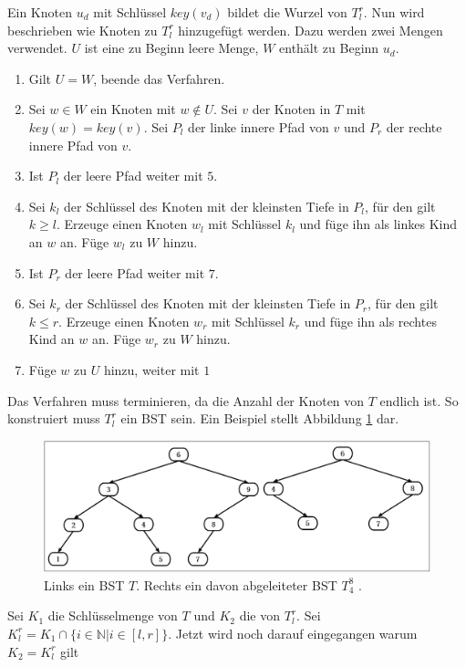 \documentclass[a4paper,12pt]{article}
\begin{document}
\noindent Ein Knoten $u_d$ mit Schlüssel $\mathit{key}(v_d)$ bildet die Wurzel von $T^r_l$. Nun wird beschrieben wie Knoten zu $T^r_l$ hinzugefügt werden.
Dazu werden zwei Mengen verwendet. $U$ ist eine zu Beginn leere Menge, $W$ enthält zu Beginn $u_d$.
\begin{enumerate}
	\item Gilt $U = W$, beende das Verfahren.
	\item Sei $w \in W$ ein Knoten mit $w \notin U$.  Sei $v$ der Knoten in $T$ mit $\mathit{key}(w ) = \mathit{key}(v)$. Sei $P_l$ der linke innere Pfad von $v$ und $P_r$ der rechte innere Pfad von $v$.
	\item Ist $P_l$ der leere Pfad weiter mit $5$.
	\item Sei $k_l$ der Schlüssel des Knoten mit der kleinsten Tiefe in $P_l$, für den gilt $k \geq l$. Erzeuge einen Knoten $w_l$ mit Schlüssel $k_l$ und füge ihn als linkes Kind an $w$ an. Füge $w_l$ zu $W$ hinzu.
	\item Ist $P_r$ der leere Pfad weiter mit $7$.
	\item Sei $k_r$ der Schlüssel des Knoten mit der kleinsten Tiefe in $P_r$, für den gilt  $k \leq r$. Erzeuge einen Knoten $w_r$ mit Schlüssel $k_r$ und füge ihn als rechtes Kind an $w$ an. Füge $w_r$ zu $W$ hinzu.	
	\item Füge $w$ zu $U$ hinzu, weiter mit $1$
\end{enumerate}
Das Verfahren muss terminieren, da die Anzahl der Knoten von $T$ endlich ist. So konstruiert muss $T^r_l$ ein BST sein. Ein Beispiel stellt Abbildung \ref{fig:T_r_l} dar. 
\begin{figure}[H]
	\centering
	\includegraphics[width= 1\textwidth]{"Medien/DynOpt/T_r_l"}
	\caption{Links ein BST $T$. Rechts ein davon abgeleiteter BST $T^8_4$ .  }
	\label{fig:T_r_l}
\end{figure}

\noindent Sei $K_1$ die Schlüsselmenge von $T$ und $K_2$ die von $T^r_l$. Sei ${K^r_l = K_1 \cap \{i \in \mathbb{N}\vert i \in \left[l,r\right] \}}$. Jetzt wird noch darauf eingegangen warum $K_2 = K^r_l$ gilt \\
\end{document}
